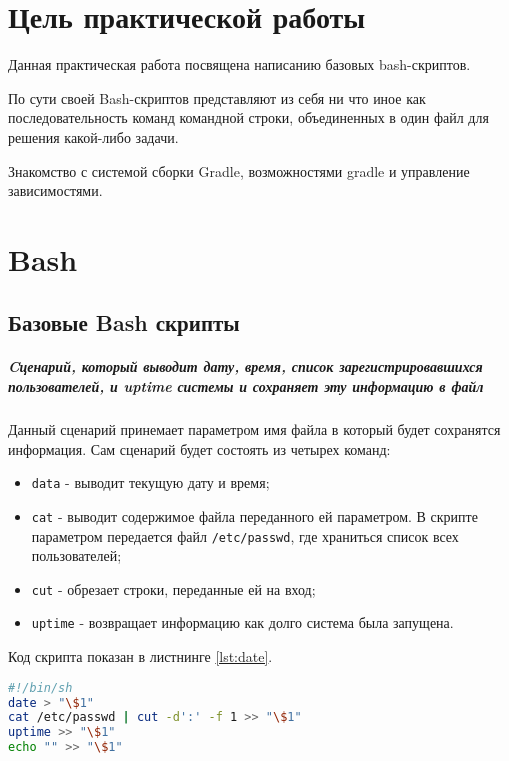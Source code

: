 \graphicspath{{~/Documents/SADT/SecondTask/img/}}
\chapter*{\LARGE{Цель практической работы}}
Данная практическая работа посвящена написанию базовых bash-скриптов.\par
По сути своей Bash-скриптов представляют из себя ни что иное как
последовательность команд командной строки, объединенных в один файл
для решения какой-либо задачи.\par
Знакомство с системой сборки Gradle, возможностями gradle и
управление зависимостями.

\chapter{Bash}
\section{Базовые Bash скрипты}
\paragraph{Cценарий, который выводит дату, время, список
зарегистрировавшихся пользователей, и uptime системы и сохраняет
эту информацию в файл}\mbox{}\par
Данный сценарий принемает параметром имя файла в который будет сохранятся
информация. Сам сценарий будет состоять из четырех команд:
\begin{itemize}
	\item \texttt{data} - выводит текущую дату и время;
	\item \texttt{cat} - выводит содержимое файла переданного ей параметром.
		В скрипте параметром передается файл \texttt{/etc/passwd},
		где храниться список всех пользователей;
	\item \texttt{cut} - обрезает строки, переданные ей на вход;
	\item \texttt{uptime} - возвращает информацию как долго система
		была запущена.
\end{itemize}
Код скрипта показан в листнинге \ref{lst:date}.

\begin{lstlisting}[language=Bash
	, caption=\leftline{Код скрипта}
	, label=lst:date]
#!/bin/sh
date > "\$1"
cat /etc/passwd | cut -d':' -f 1 >> "\$1"
uptime >> "\$1"
echo "" >> "\$1"
\end{lstlisting}

